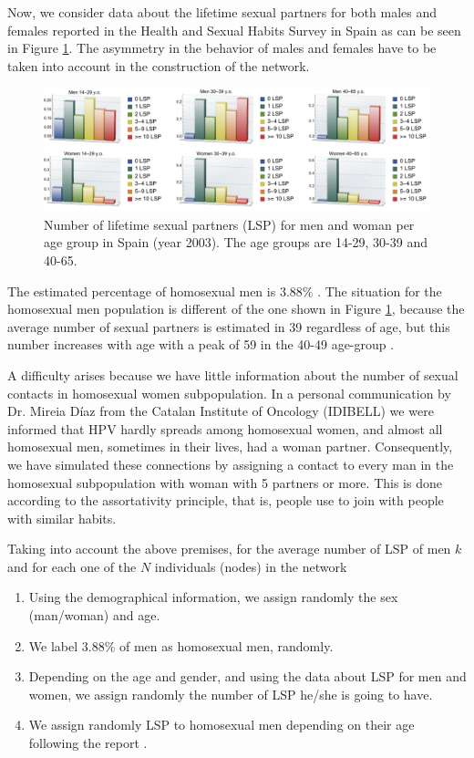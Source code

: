 Now, we consider data about the lifetime sexual partners for both males and females reported in the Health and Sexual Habits Survey in Spain \cite{INE} as can be seen in Figure \ref{lsp}. The asymmetry in the behavior of males and females have to be taken into account in the construction of the network.

\begin{figure}[h]
	\centering
	\includegraphics[scale=0.5]{lsp.pdf}
	\caption{Number of lifetime sexual partners (LSP) for men and woman per age group in Spain (year 2003). The age groups are 14-29, 30-39 and 40-65.}
	\label{lsp}
\end{figure}

The estimated percentage of homosexual men is $3.88\%$ \cite{INE}. The situation for the homosexual men population is different of the one shown in Figure \ref{lsp}, because the average number of sexual partners is estimated in 39 regardless of age, but this number increases with age with a peak of 59 in the 40-49 age-group \cite{Durex2002}. 

A difficulty arises because we have little information about the number of sexual contacts in homosexual women subpopulation. In a personal communication by Dr. Mireia Díaz from the Catalan Institute of Oncology (IDIBELL) we were informed that HPV hardly spreads among homosexual women, and almost all homosexual men, sometimes in their lives, had a woman partner. Consequently, we have simulated these connections by assigning a contact to every man in the homosexual subpopulation with woman with 5 partners or more. This is done according to the assortativity principle, that is, people use to join with people with similar habits.

Taking into account the above premises, for the average number of LSP of men $k$ and for each one of the $N$ individuals (nodes) in the network

\begin{enumerate}
	\item Using the demographical information, we assign randomly the sex (man/woman) and age.
	\item We label $3.88\%$ of men as homosexual men, randomly.
	\item Depending on the age and gender, and using the data about LSP for men and women, we assign randomly the number of LSP he/she is going to have.
	\item We assign randomly LSP to homosexual men depending on their age following the report \cite{Durex2002}.
\end{enumerate}

